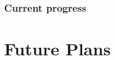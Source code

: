 \documentclass[9pt, a4paper]{article}
\newenvironment{Figure}
    {\par\medskip\noindent\minipage{\linewidth}}
    {\endminipage\par\medskip}
\begin{document}
\subsubsection{Current progress}

\section{Future Plans}
\end{document}
